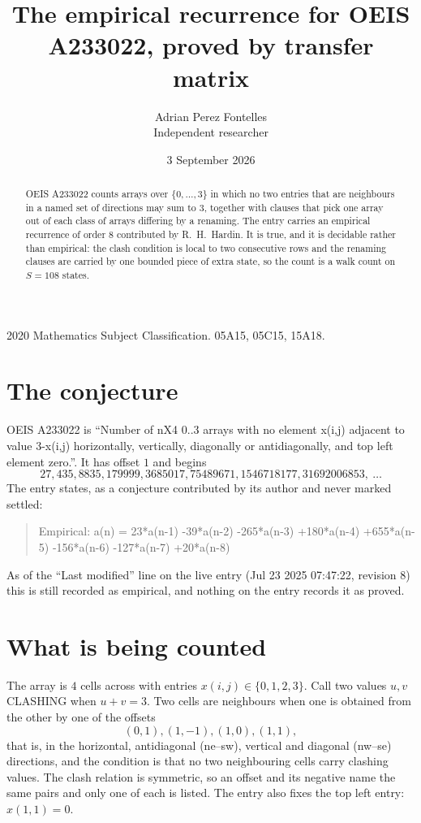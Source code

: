 \documentclass[11pt,a4paper]{article}
\title{The empirical recurrence for OEIS A233022, proved by transfer matrix}
\author{Adrian Perez Fontelles\\ \small Independent researcher}
\date{3 September 2026}
\theoremstyle{plain}
\theoremstyle{definition}
\begin{document}
\maketitle

\begin{abstract}
OEIS A233022 counts arrays over $\{0,\dots,3\}$ in which no two entries that are neighbours in
a named set of directions may sum to $3$, together with clauses that pick one array out of
each class of arrays differing by a renaming. The entry carries an empirical recurrence of
order $8$ contributed by R.~H.~Hardin. It is true, and it is decidable rather than
empirical: the clash condition is local to two consecutive rows and the renaming clauses are
carried by one bounded piece of extra state, so the count is a walk count on $S=108$ states.
\end{abstract}

\noindent\small 2020 Mathematics Subject Classification. 05A15, 05C15, 15A18.\normalsize

\section{The conjecture}

OEIS A233022 is ``Number of nX4 0..3 arrays with no element x(i,j) adjacent to value 3-x(i,j) horizontally, vertically, diagonally or antidiagonally, and top left element zero.''. It has offset $1$ and begins
\[
27, 435, 8835, 179999, 3685017, 75489671, 1546718177, 31692006853,\ \dots
\]
The entry states, as a conjecture contributed by its author and never marked settled:
\begin{quote}
Empirical: a(n) = 23*a(n-1) -39*a(n-2) -265*a(n-3) +180*a(n-4) +655*a(n-5) -156*a(n-6) -127*a(n-7) +20*a(n-8)
\end{quote}
As of the ``Last modified'' line on the live entry (Jul 23 2025 07:47:22, revision 8) this is still
recorded as empirical, and nothing on the entry records it as proved.

\section{What is being counted}

The array is $4$ cells across with entries $x(i,j)\in\{0,1,2,3\}$. Call two values $u,v$ CLASHING
when $u+v=3$. Two cells are neighbours when one is obtained from the other by one of
the offsets
\[
(0,1), (1,-1), (1,0), (1,1),
\]
that is, in the horizontal, antidiagonal (ne--sw), vertical and diagonal (nw--se) directions, and the condition is that no two neighbouring cells carry
clashing values. The clash relation is symmetric, so an offset and its negative name the
same pairs and only one of each is listed. The entry also fixes the top left entry: $x(1,1)=0$.
\end{document}
